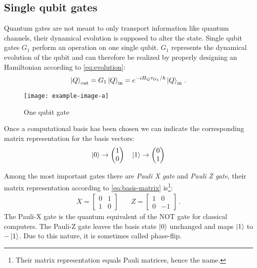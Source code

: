 \subsection{Single qubit gates}
Quantum gates are not meant to only transport information like quantum channels, their dynamical evolution is supposed to alter the state.
Single qubit gates $G_1$ perform an operation on one single qubit. $G_1$ represents the dynamical evolution of the qubit and can therefore be realized by properly designing an Hamiltonian according to \ref{eq:evolution}:
\begin{equation*}
   \ket{Q}_\text{out} = G_1\ket{Q}_\text{in} = e^{-iH_Q \tau_{G_1}/\hbar}\ket{Q}_\text{in}\,.
\end{equation*}
\begin{figure}
\centering
\texttt{[image: example-image-a]}
\caption{One qubit gate}
\label{fig:single-qubit-gate}
\end{figure}


Once a computational basis has been chosen we can indicate the corresponding matrix representation for the basis vectors:
\begin{equation}\label{eq:basis-matrix}
    \ket{0} \rightarrow \begin{pmatrix} 1 \\ 0 \end{pmatrix} \quad \ket{1} \rightarrow \begin{pmatrix} 0 \\ 1 \end{pmatrix}
\end{equation}

Among the most important gates there are \emph{Pauli X gate} and \emph{Pauli Z gate}, their matrix representation according to \ref{eq:basis-matrix} is\footnote{Their matrix representation equals Pauli matrices, hence the name.}:
\begin{align*}
    X = 
    \begin{bmatrix}
    0 & 1\\
    1 & 0
    \end{bmatrix} 
    \quad &
     Z = 
    \begin{bmatrix}
    1 & 0\\
    0 & -1
    \end{bmatrix}\,.
\end{align*}
The Pauli-X gate is the quantum equivalent of the NOT gate for classical computers. 
The Pauli-Z gate leaves the basis state $\ket{0}$  unchanged and maps $\ket{1}$  to $-\ket{1}$. Due to this nature, it is sometimes called phase-flip. 
